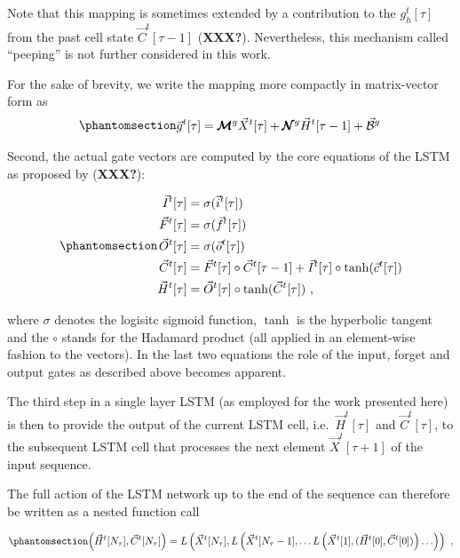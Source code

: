 \documentclass[
]{agujournal2019}
\begin{document}
Note that this mapping is sometimes extended by a contribution to the
\(g_h^t[\tau]\) from the past cell state \(\vec{C}^t[\tau-1]\)
(\textbf{XXX?}). Nevertheless, this mechanism called ``peeping'' is not
further considered in this work.

For the sake of brevity, we write the mapping more compactly in
matrix-vector form as
\begin{equation}\phantomsection\label{eq-LSTM-gates}{
\begin{aligned}
\vec{g}^t[\tau] = \pmb{\mathcal{M}}^{g}\vec{X}^t[\tau] + \pmb{\mathcal{N}}^{g}  \vec{H}^t[ \tau-1]+ \vec{\mathcal{B}}^g \,
\end{aligned}
}\end{equation}

Second, the actual gate vectors are computed by the core equations of
the LSTM as proposed by (\textbf{XXX?}):

\begin{equation}\phantomsection\label{eq-LSTM}{
\begin{aligned}
\vec{I}^t[\tau] &= \sigma(\vec{i}^t[\tau]) \\
\vec{F}^t[\tau] &= \sigma(\vec{f}^t[\tau]) \\
\vec{O}^t[\tau] &= \sigma(\vec{o}^t[\tau]) \\
\vec{C}^t[\tau] &= \vec{F}^t[\tau] \circ \vec{C}^t[\tau-1]  + \vec{I}^t[\tau] \circ \tanh(\vec{c}^t[\tau]) \\
\vec{H}^t[\tau]  &= \vec{O}^t[\tau] \circ \tanh(\vec{C}^t[\tau]) \ ,
\end{aligned}
}\end{equation}

where \(\sigma\) denotes the logisitc sigmoid function, \(\tanh\) is the
hyperbolic tangent and the \(\circ\) stands for the Hadamard product
(all applied in an element-wise fashion to the vectors). In the last two
equations the role of the input, forget and output gates as described
above becomes apparent.

The third step in a single layer LSTM (as employed for the work
presented here) is then to provide the output of the current LSTM cell,
i.e.~\(\vec{H}^t[\tau]\) and \(\vec{C}^t[\tau]\), to the subsequent LSTM
cell that processes the next element \(\vec{X}^t[\tau+1]\) of the input
sequence.

The full action of the LSTM network up to the end of the sequence can
therefore be written as a nested function call

\begin{equation}\phantomsection\label{eq-L_nested}{
\left(\vec{H}^t[N_\tau], \vec{C}^t[N_\tau] \right) = L \left( \vec{X}^t[N_\tau], L \left( \vec{X}^t[N_\tau-1], \ldots L \left( \vec{X}^t[1], (\vec{H}^t[0], \vec{C}^t[0]) \right) \ldots \right) \right) \ ,
}\end{equation}
\end{document}
